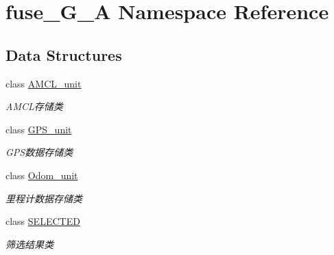 \hypertarget{namespacefuse___g___a}{}\section{fuse\+\_\+\+G\+\_\+A Namespace Reference}
\label{namespacefuse___g___a}
\subsection*{Data Structures}
\begin{DoxyCompactItemize}
\item 
class \hyperlink{classfuse___g___a_1_1_a_m_c_l__unit}{A\+M\+C\+L\+\_\+unit}
\begin{DoxyCompactList}\small\item\em A\+M\+C\+L存储类 \end{DoxyCompactList}\item 
class \hyperlink{classfuse___g___a_1_1_g_p_s__unit}{G\+P\+S\+\_\+unit}
\begin{DoxyCompactList}\small\item\em G\+P\+S数据存储类 \end{DoxyCompactList}\item 
class \hyperlink{classfuse___g___a_1_1_odom__unit}{Odom\+\_\+unit}
\begin{DoxyCompactList}\small\item\em 里程计数据存储类 \end{DoxyCompactList}\item 
class \hyperlink{classfuse___g___a_1_1_s_e_l_e_c_t_e_d}{S\+E\+L\+E\+C\+T\+ED}
\begin{DoxyCompactList}\small\item\em 筛选结果类 \end{DoxyCompactList}\end{DoxyCompactItemize}
